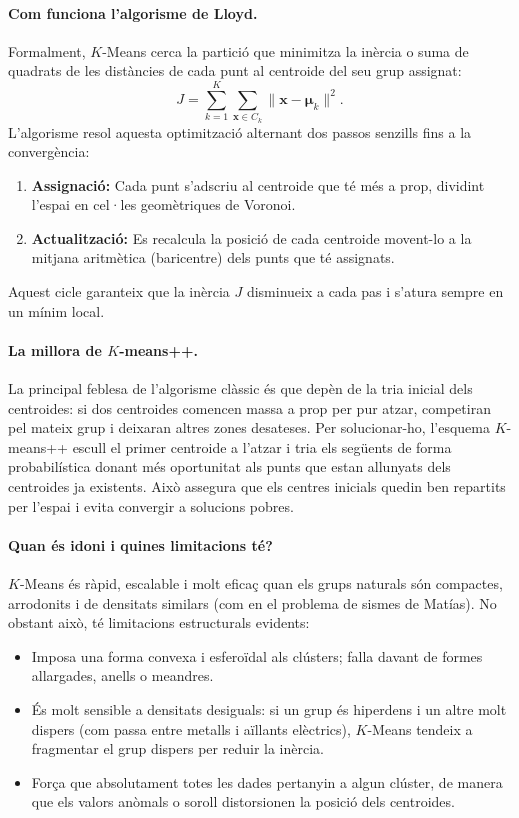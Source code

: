 \documentclass[a4paper,11pt]{article}
\begin{document}
\paragraph{Com funciona l'algorisme de Lloyd.} Formalment, $K$-Means cerca la partició que minimitza la inèrcia o suma de quadrats de les distàncies de cada punt al centroide del seu grup assignat:
\begin{equation}
    J = \sum_{k=1}^K \sum_{\mathbf{x} \in C_k} \lVert \mathbf{x} - \boldsymbol{\mu}_k \rVert^2.
\end{equation}
L'algorisme resol aquesta optimització alternant dos passos senzills fins a la convergència:
\begin{enumerate}
    \item \textbf{Assignació:} Cada punt s'adscriu al centroide que té més a prop, dividint l'espai en cel·les geomètriques de Voronoi.
    \item \textbf{Actualització:} Es recalcula la posició de cada centroide movent-lo a la mitjana aritmètica (baricentre) dels punts que té assignats.
\end{enumerate}
Aquest cicle garanteix que la inèrcia $J$ disminueix a cada pas i s'atura sempre en un mínim local.

\paragraph{La millora de $K$-means++.} La principal feblesa de l'algorisme clàssic és que depèn de la tria inicial dels centroides: si dos centroides comencen massa a prop per pur atzar, competiran pel mateix grup i deixaran altres zones desateses. Per solucionar-ho, l'esquema $K$-means++ \cite{arthur2007} escull el primer centroide a l'atzar i tria els següents de forma probabilística donant més oportunitat als punts que estan allunyats dels centroides ja existents. Això assegura que els centres inicials quedin ben repartits per l'espai i evita convergir a solucions pobres.

\paragraph{Quan és idoni i quines limitacions té?} $K$-Means és ràpid, escalable i molt eficaç quan els grups naturals són compactes, arrodonits i de densitats similars (com en el problema de sismes de Matías). No obstant això, té limitacions estructurals evidents:
\begin{itemize}
    \item Imposa una forma convexa i esferoïdal als clústers; falla davant de formes allargades, anells o meandres.
    \item És molt sensible a densitats desiguals: si un grup és hiperdens i un altre molt dispers (com passa entre metalls i aïllants elèctrics), $K$-Means tendeix a fragmentar el grup dispers per reduir la inèrcia.
    \item Força que absolutament totes les dades pertanyin a algun clúster, de manera que els valors anòmals o soroll distorsionen la posició dels centroides.
\end{itemize}
\end{document}

